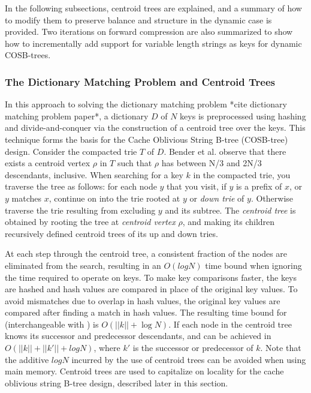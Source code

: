 \documentclass{style}
\begin{document}
In the following subsections, centroid trees are explained, and a summary of how to modify them to preserve balance and structure in the dynamic case is provided. Two iterations on forward compression are also summarized to show how to incrementally add support for variable length strings as keys for dynamic COSB-trees.

\subsubsection{The Dictionary Matching Problem and Centroid Trees} %
In this approach to solving the dictionary matching problem *cite dictionary matching problem paper*, a dictionary $D$ of $N$ keys is preprocessed using hashing and divide-and-conquer via the construction of a centroid tree over the keys. This technique forms the basis for the Cache Oblivious String B-tree (COSB-tree) design. Consider the compacted trie $T$ of $D$. Bender et al. observe that there exists a centroid vertex $\rho$ in $T$ such that $\rho$ has between N/3 and 2N/3 descendants, inclusive. When searching for a key $k$ in the compacted trie, you traverse the tree as follows: for each node $y$ that you visit, if $y$ is a prefix of $x$, or $y$ matches $x$, continue on into the trie rooted at $y$ or \emph{down trie} of $y$. Otherwise traverse the trie resulting from excluding $y$ and its subtree. The \emph{centroid tree} is obtained by rooting the tree at \emph{centroid vertex} $\rho$, and making its children recursively defined centroid trees of its up and down tries. 

At each step through the centroid tree, a consistent fraction of the nodes are eliminated from the search, resulting in an $O(logN)$ time bound when ignoring the time required to operate on keys. To make key comparisons faster, the keys are hashed and hash values are compared in place of the original key values. To avoid mismatches due to overlap in hash values, the original key values are compared after finding a match in hash values. The resulting time bound for \Search{} (interchangeable with \Member{}) is $O(||k||+\log{}N)$. If each node in the centroid tree knows its successor and predecessor descendants, \Pred{} and \Succ{} can be achieved in $O(||k||+||k'||+logN)$, where $k'$ is the successor or predecessor of $k$. Note that the additive $logN$ incurred by the use of centroid trees can be avoided when using main memory. Centroid trees are used to capitalize on locality for the cache oblivious string B-tree design, described later in this section.
\end{document}
